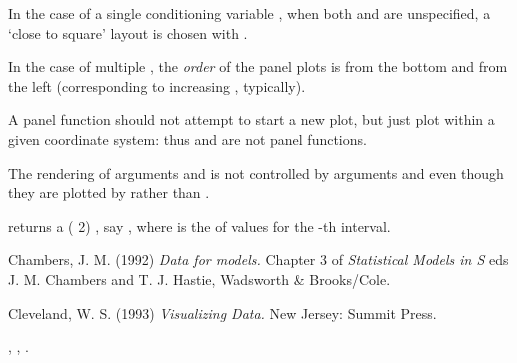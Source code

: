 %
\begin{Details}\relax
In the case of a single conditioning variable , when both
 and  are unspecified, a `close to
square' layout is chosen with .

In the case of multiple , the \emph{order} of the panel
plots is from the bottom and from the left (corresponding to
increasing , typically).

A panel function should not attempt to start a new plot, but just plot
within a given coordinate system: thus  and 
are not panel functions.

The rendering of arguments  and
 is not controlled by  arguments
 and  even though they are plotted by
 rather than .
\end{Details}
%
\begin{Value}
 returns a ( \eqn{\times}{}
2) , say ,  where  is
the  of  values for the -th interval.
\end{Value}
%
\begin{References}\relax
Chambers, J. M. (1992)
\emph{Data for models.}
Chapter 3 of \emph{Statistical Models in S}
eds J. M. Chambers and T. J. Hastie, Wadsworth \& Brooks/Cole.

Cleveland, W. S. (1993) \emph{Visualizing Data.} New Jersey: Summit Press.
\end{References}
%
\begin{SeeAlso}\relax
{},
,
.
\end{SeeAlso}
%
